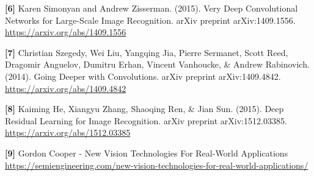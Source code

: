\documentclass{article}
\begin{document}
     \textbf{[6]} Karen Simonyan and Andrew Zisserman. (2015). Very Deep Convolutional Networks for Large-Scale Image Recognition. arXiv preprint arXiv:1409.1556. \url{https://arxiv.org/abs/1409.1556}
    
    \textbf{[7]} Christian Szegedy, Wei Liu, Yangqing Jia, Pierre Sermanet, Scott Reed, Dragomir Anguelov, Dumitru Erhan, Vincent Vanhoucke, \& Andrew Rabinovich. (2014). Going Deeper with Convolutions. arXiv preprint arXiv:1409.4842. \url{https://arxiv.org/abs/1409.4842}

    \textbf{[8]} Kaiming He, Xiangyu Zhang, Shaoqing Ren, \& Jian Sun. (2015). Deep Residual Learning for Image Recognition. arXiv preprint arXiv:1512.03385. \url{https://arxiv.org/abs/1512.03385}

    \textbf{[9]} Gordon Cooper - New Vision Technologies For Real-World Applications \\
    \url{https://semiengineering.com/new-vision-technologies-for-real-world-applications/}
\end{document}
